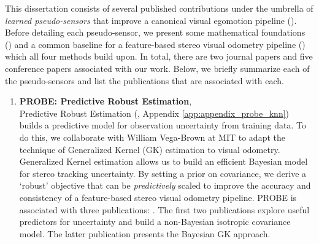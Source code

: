 This dissertation consists of several published contributions under the umbrella of \textit{learned pseudo-sensors} that improve a canonical visual egomotion pipeline (). Before detailing each pseudo-sensor, we present some mathematical foundations () and a common baseline for a feature-based stereo visual odometry pipeline () which all four methods build upon. In total, there are two journal papers and five conference papers associated with our work. Below, we briefly summarize each of the pseudo-sensors and list the publications that are associated with each.
\begin{enumerate}
\item \textbf{PROBE: Predictive Robust Estimation},  \\
Predictive Robust Estimation (, Appendix \ref{app:appendix_probe_knn}) builds a predictive model for observation uncertainty from training data. To do this, we collaborate with William Vega-Brown at MIT to adapt the technique of Generalized Kernel (GK) estimation \citep{Vega-Brown2014-sb} to visual odometry. Generalized Kernel estimation allows us to build an efficient Bayesian model for stereo tracking uncertainty. By setting a prior on covariance, we derive a `robust' objective that can be \textit{predictively} scaled to improve the accuracy and consistency of a feature-based stereo visual odometry pipeline. PROBE is associated with three publications: \cite{2015_Peretroukhin_PROBE,2015_Peretroukhin_Get,Peretroukhin2016-om}. The first two publications explore useful predictors for uncertainty and build a non-Bayesian isotropic covariance model. The latter publication presents the Bayesian GK approach.


\end{enumerate}

